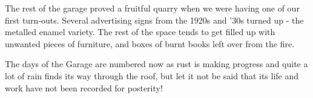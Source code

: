 The rest of the garage proved a fruitful quarry when we were having one of our first turn-outs. Several advertising signs from the 1920s and '30s turned up - the metalled enamel variety. The rest of the space tends to get filled up with unwanted pieces of furniture, and boxes of burnt books left over from the fire.

The days of the Garage are numbered now as rust is making progress and quite a lot of rain finds its way through the roof, but let it not be said that its life and work have not been recorded for posterity!
